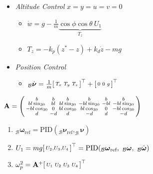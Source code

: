 \documentclass[landscape,a0paper,fontscale=0.285]{baposter} %
\newcommand{\compresslist}{ %
\setlength{\itemsep}{1pt}
\setlength{\parskip}{0pt}
\setlength{\parsep}{0pt}
}
\renewenvironment{bmatrix}{\left[\begin{smallmatrix}}{\end{smallmatrix}\right]}
\renewenvironment{pmatrix}{\left(\begin{smallmatrix}}{\end{smallmatrix}\right)}
\begin{document}
\begin{poster}
{\begin{itemize}
\item \textit{Altitude Control} $x = y = u = v = 0$
  \begin{itemize}[label=$\circ$]\compresslist
      \item $\dot{w} = g - \frac{1}{m}\underbrace{\cos\phi \cos\theta ~ U_1}_{T_z}$
      \item $T_z = -k_p(z^* - z) + k_d \dot{z} - mg$
  \end{itemize}

\item \textit{Position Control}
  \begin{itemize}[label=$\circ$]\compresslist
      \item $_{\mathcal{B}}{\dot{\boldsymbol{\nu}}} = \frac{1}{m}\begin{bmatrix}T_x & T_y & T_z\end{bmatrix}^\top + \begin{bmatrix}0 & 0 & g\end{bmatrix}^\top$
  \end{itemize}

\end{itemize}



\colorbox[HTML]{CCFFFF}{}
$
\mathbf{A} = \begin{pmatrix}b & b & b & b & b & b\\ bl\sin_{30} & bl & bl\sin_{30} & -bl\sin_{30} & -bl & -bl\sin_{30}\\ -bl\cos_{30} & 0 & bl\cos_{30} & bl\cos_{30} & 0 & -bl\cos_{30} \\ d & -d & d & -d & d & -d\end{pmatrix}
$

\colorbox[HTML]{CCFFFF}{}
\begin{enumerate}\compresslist
    \item $_{\mathcal{B}}\boldsymbol{\omega}_{\text{ref}} = \text{PID}(_{\mathcal{B}}\boldsymbol{\nu}_{\text{ref}}, _{\mathcal{B}}\boldsymbol{\nu})$
    \item $U_1 = mg \\ \begin{bmatrix}U_2, U_3, U_4\end{bmatrix}^\top = \text{PID}(_{\mathcal{B}}\boldsymbol{\omega}_{\text{ref}}, ~_{\mathcal{B}}\boldsymbol{\omega}, ~_{\mathcal{B}}\dot{\boldsymbol{\omega}})$
    \item $\omega_p^2 = \mathbf{A}^+ \begin{bmatrix}U_1 & U_2 & U_3 & U_4\end{bmatrix}^\top$
\end{enumerate}

}
\end{poster}
\end{document}
